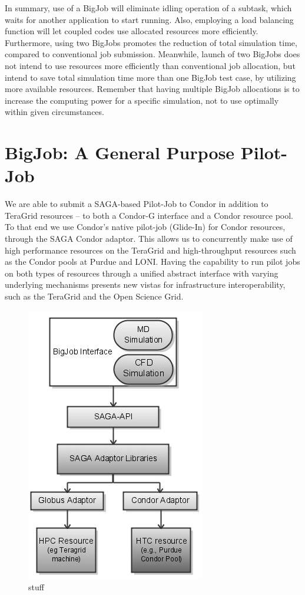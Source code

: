 \documentclass[conference,final]{IEEEtran}
\begin{document}
In summary, use of a BigJob will eliminate idling operation of a
subtask, which waits for another application to start running. Also,
employing a load balancing function will let coupled codes use
allocated resources more efficiently. Furthermore, using two BigJobs
promotes the reduction of total simulation time, compared to
conventional job submission. Meanwhile, launch of two BigJobs does not
intend to use resources more efficiently than conventional job
allocation, but intend to save total simulation time more than one
BigJob test case, by utilizing more available resources. Remember that
having multiple BigJob allocations is to increase the computing power
for a specific simulation, not to use optimally within given
circumstances.


\section{BigJob: A General Purpose Pilot-Job}

We are able to submit a SAGA-based Pilot-Job to Condor in addition to
TeraGrid resources -- to both a Condor-G interface and a Condor
resource pool. To that end we use Condor's native pilot-job (Glide-In)
for Condor resources, through the SAGA Condor adaptor. This allows us
to concurrently make use of high performance resources on the TeraGrid
and high-throughput resources such as the Condor pools at Purdue and
LONI. Having the capability to run pilot jobs on both types of
resources through a unified abstract interface with varying underlying
mechanisms presents new vistas for infrastructure interoperability,
such as the TeraGrid and the Open Science Grid.

\begin{figure} \centering 
\includegraphics[scale=0.66]{BWSAGA}
\caption{\small stuff} 
\label{plot}
\end{figure}
\end{document}
